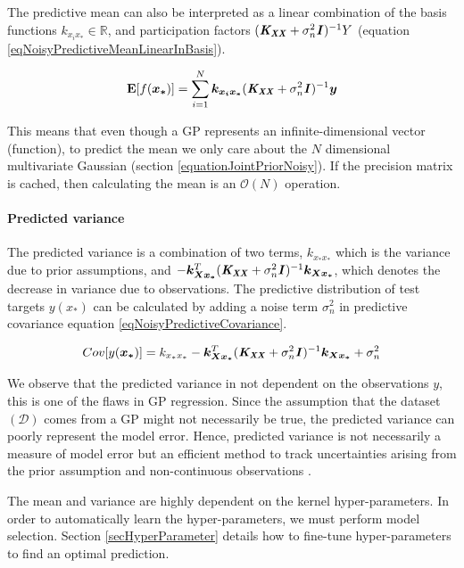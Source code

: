 The predictive mean can also be interpreted as a linear combination of the basis functions $k_{x_{i}x_{*}} \in \mathbb{R}$, and participation factors $( \bm{\mathit{K_{XX}}} + \sigma^{2}_{n}\bm{\mathit{I}})^{-1}Y$ (equation \ref{eqNoisyPredictiveMeanLinearInBasis}). 

  \begin{equation}\label{eqNoisyPredictiveMeanLinearInBasis}
  \mathbf{E}[f(\boldsymbol{x_{*}})] = \sum_{i = 1}^{N} \boldsymbol{k_{x_{i}x_{*}}}( \bm{\mathit{K_{XX}}} + \sigma^{2}_{n}\bm{\mathit{I}})^{-1} \boldsymbol{y}
  \end{equation}
  
This means that even though a GP represents an infinite-dimensional vector (function), to predict the mean we only care about the $N$ dimensional multivariate Gaussian (section \ref{equationJointPriorNoisy}). If the precision matrix is cached, then calculating the mean is an $\mathcal{O}\left ( N \right )$ operation.

\paragraph{Predicted variance}
The predicted variance is a combination of two terms, $k_{x_{*}x_{*}}$ which is the variance due to prior assumptions, and $- \boldsymbol{k_{Xx_{*}}}^{T}( \bm{\mathit{K_{XX}}} + \sigma^{2}_{n}\bm{\mathit{I}} )^{-1} \boldsymbol{k_{Xx_{*}}}$, which denotes the decrease in variance due to observations. The predictive distribution of test targets $y(x_{*})$ can be calculated by adding a noise term $\sigma^{2}_{n}$ in predictive covariance equation \ref{eqNoisyPredictiveCovariance}. 

  \begin{equation}\label{eqNoisyPredictiveCovarianceOnNoisyTarget}
	Cov[y(\boldsymbol{x_{*}})] = k_{x_{*}x_{*}} - \boldsymbol{k_{Xx_{*}}}^{T}( \bm{\mathit{K_{XX}}} + \sigma^{2}_{n}\bm{\mathit{I}} )^{-1} \boldsymbol{k_{Xx_{*}}} + \sigma_{n}^{2}
  \end{equation}
  
We observe that the predicted variance in not dependent on the observations $y$, this is one of the flaws in GP regression. Since the assumption that the dataset $(\mathcal{D})$ comes from a GP might not necessarily be true, the predicted variance can poorly represent the model error. Hence, predicted variance is not necessarily a measure of model error but an efficient method to track uncertainties arising from the prior assumption and non-continuous observations \cite{shah2014student}.

The mean and variance are highly dependent on the kernel hyper-parameters. In order to automatically learn the hyper-parameters, we must perform model selection. Section \ref{secHyperParameter} details how to fine-tune hyper-parameters to find an optimal prediction.

